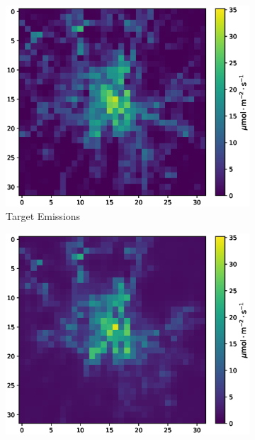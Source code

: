 \begin{figure}[htb]
    \centering
    \begin{minipage}[b]{\textwidth}
        \centering
        \begin{subfigure}[b]{0.32\textwidth}
            \includegraphics[width=\textwidth]{figures/06_results/gaussian_plume_example/munich/target.eps}
            \caption{Target Emissions}
        \end{subfigure}
        \begin{subfigure}[b]{0.32\textwidth}
            \includegraphics[width=\textwidth]{figures/06_results/gaussian_plume_example/munich/gen_2048_fine_tuned_snr_20_db.eps}

\end{subfigure}
\end{minipage}
\end{figure}
